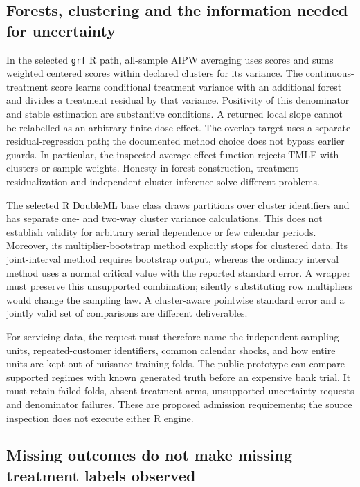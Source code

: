\subsection{Forests, clustering and the information needed for uncertainty}

In the selected \texttt{grf} R path, all-sample AIPW averaging uses scores and
sums weighted centered scores within declared clusters for its variance.
The continuous-treatment score learns conditional treatment variance with an
additional forest and divides a treatment residual by that variance. Positivity
of this denominator and stable estimation are substantive conditions. A returned
local slope cannot be relabelled as an arbitrary finite-dose effect. The overlap
target uses a separate residual-regression path; the documented method choice
does not bypass earlier guards. In particular, the inspected average-effect
function rejects TMLE with clusters or sample weights. Honesty in forest
construction, treatment residualization and independent-cluster inference solve
different problems.
\citep{exec13_grf_rpath,grf2018}

The selected R DoubleML base class draws partitions over cluster identifiers
and has separate one- and two-way cluster variance calculations. This does not
establish validity for arbitrary serial dependence or few calendar periods.
Moreover, its multiplier-bootstrap method explicitly stops for clustered data.
Its joint-interval method requires bootstrap output, whereas the ordinary
interval method uses a normal critical value with the reported standard error.
A wrapper must preserve this unsupported combination; silently substituting
row multipliers would change the sampling law. A cluster-aware pointwise
standard error and a jointly valid set of comparisons are different deliverables.
\citep{exec20_rfx_doubleml_r}

For servicing data, the request must therefore name the independent sampling
units, repeated-customer identifiers, common calendar shocks, and how entire
units are kept out of nuisance-training folds. The public prototype can compare
supported regimes with known generated truth before an expensive bank trial.
It must retain failed folds, absent treatment arms, unsupported uncertainty
requests and denominator failures. These are proposed admission requirements;
the source inspection does not execute either R engine.

\subsection{Missing outcomes do not make missing treatment labels observed}


